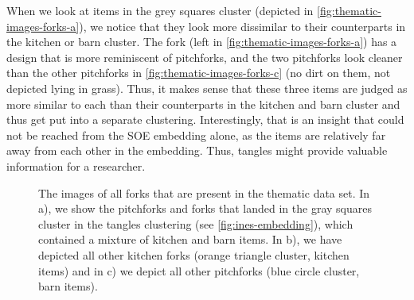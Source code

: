 When we look at items in the grey squares cluster (depicted in \autoref{fig:thematic-images-forks-a}), we notice that they look more dissimilar to their
counterparts in the kitchen or barn cluster. The fork (left in \autoref{fig:thematic-images-forks-a}) has a design that is more reminiscent of pitchforks, and the two pitchforks
look cleaner than the other pitchforks in \autoref{fig:thematic-images-forks-c} (no dirt on them, not depicted lying in grass). Thus, it makes sense that these three items are judged
as more similar to each than their counterparts in the kitchen and barn cluster and thus get put into a separate clustering. 
Interestingly, that is an insight that could not be reached from the SOE embedding alone, as the items are relatively far away from each other in the embedding. Thus, tangles might provide valuable information for a researcher. 

\begin{figure}[h]
    \centering
    \hfill
    \hfill
    \caption{
        The images of all forks that are present in the thematic data set. In a), we show the pitchforks and forks that landed in
        the gray squares cluster in the tangles clustering (see \autoref{fig:ines-embedding}), which contained a mixture of kitchen and barn items.
        In b), we have depicted all other kitchen forks (orange triangle cluster, kitchen items) and in c) we depict all other pitchforks 
        (blue circle cluster, barn items).
    }
    \label{fig:thematic-images-forks}
\end{figure}

